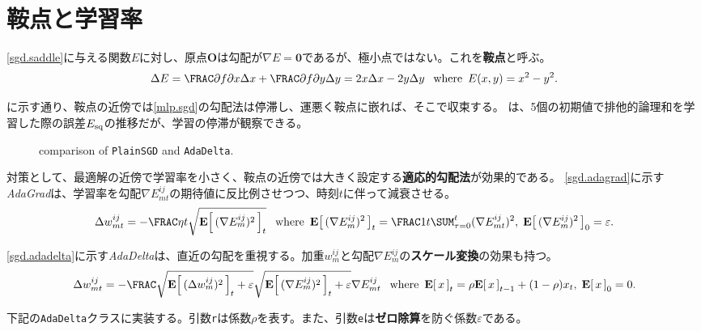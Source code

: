 \documentclass[10pt,a4paper]{book}
\begin{document}
\section{鞍点と学習率\label{sect:nn.sgd}}

\eqref{sgd.saddle}に与える関数$E$に対し、原点$\bm{O}$は勾配が$\nabla E\!=\!\bm{0}$であるが、極小点ではない。これを\textbf{鞍点}と呼ぶ。
%
\begin{equation}
\label{eq:sgd.saddle}
\Delta E = \pdiff{f}{x} \Delta x + \pdiff{f}{y} \Delta y = 2x \Delta x - 2y \Delta y\;\where E(x,y) = x^2 - y^2.
\end{equation}

に示す通り、鞍点の近傍では\eqref{mlp.sgd}の勾配法は停滞し、運悪く鞍点に嵌れば、そこで収束する。
は、5個の初期値で排他的論理和を学習した際の誤差$E_\mathrm{sq}$の推移だが、学習の停滞が観察できる。

\begin{figure}[h]
\centering
{}
\caption{comparison of \texttt{PlainSGD} and \texttt{AdaDelta}.\label{fig:sgd}}
\end{figure}

対策として、最適解の近傍で学習率を小さく、鞍点の近傍では大きく設定する\textbf{適応的勾配法}が効果的である。
\eqref{sgd.adagrad}に示す\textit{AdaGrad}は、学習率を勾配$\nabla E_{mt}^{ij}$の期待値に反比例させつつ、時刻$t$に伴って減衰させる。
%
\begin{equation}
\label{eq:sgd.adagrad}
\Delta w_{mt}^{ij} = -\frac{\eta}{t\sqrt{\E{(\nabla E_m^{ij})^2}_t}}\;
\where \E{(\nabla E_m^{ij})^2}_t = \frac{1}{t} \sum_{\tau=0}^t (\nabla E_{mt}^{ij})^2,\;
\E{(\nabla E_m^{ij})^2}_0 = \varepsilon.
\end{equation}

\eqref{sgd.adadelta}に示す\textit{AdaDelta}は、直近の勾配を重視する。加重$w_m^{ij}$と勾配$\nabla E_m^{ij}$の\textbf{スケール変換}の効果も持つ。
%
\begin{equation}
\label{eq:sgd.adadelta}
\Delta w_{mt}^{ij} = -\frac{\sqrt{\E{(\Delta w_m^{ij})^2}_t+\varepsilon}}{\sqrt{\E{(\nabla E_m^{ij})^2}_t+\varepsilon}} \nabla E_{mt}^{ij}\;
\where \E{x}_t = \rho \E{x}_{t-1} + (1-\rho) x_t,\;
\E{x}_0 = 0.
\end{equation}

下記の\texttt{AdaDelta}クラスに実装する。引数\texttt{r}は係数$\rho$を表す。また、引数\texttt{e}は\textbf{ゼロ除算}を防ぐ係数$\varepsilon$である。
\end{document}
